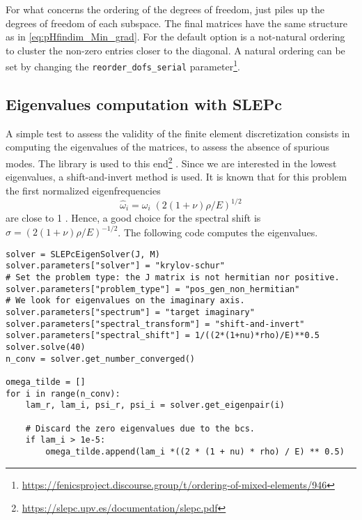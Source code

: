 For what concerns the ordering of the degrees of freedom, \firedrake just piles up the degrees of freedom of each subspace. The final matrices have the same structure as in \eqref{eq:pHfindim_Min_grad}. For \fenics the default option is a not-natural ordering to cluster the non-zero entries closer to the diagonal. A natural ordering can be set by changing the \verb|reorder_dofs_serial| parameter\footnote{\url{https://fenicsproject.discourse.group/t/ordering-of-mixed-elements/946}}.

\subsection*{Eigenvalues computation with SLEPc}
A simple test to assess the validity of the finite element discretization consists in computing the eigenvalues of the matrices, to assess the absence of spurious modes. The {} library is used to this end\footnote{\url{https://slepc.upv.es/documentation/slepc.pdf}} \cite{hernandez2005slepc}. Since we are interested in the lowest eigenvalues, a shift-and-invert method is used. It is known that for this problem the first normalized eigenfrequencies
\[
\widehat{\omega}_i = \omega_i \; (2(1+\nu)\rho/E)^{1/2}
\]
are close to 1 \cite{dawe1980rayleigh}. Hence, a good choice for the spectral shift is $\sigma = (2(1+\nu)\rho/E)^{-1/2}$.  The following code computes the eigenvalues.
\begin{tcolorbox}[title = Eigenvalues computation in  \fenics, coltitle=black, breakable, size=fbox, boxrule=1pt, pad at break*=1mm, colframe=red, enlarge top by=0.25em, enlarge bottom by=0.5em]
\begin{Verbatim}[tabsize=4]
solver = SLEPcEigenSolver(J, M)
solver.parameters["solver"] = "krylov-schur"
# Set the problem type: the J matrix is not hermitian nor positive.
solver.parameters["problem_type"] = "pos_gen_non_hermitian"
# We look for eigenvalues on the imaginary axis.
solver.parameters["spectrum"] = "target imaginary"
solver.parameters["spectral_transform"] = "shift-and-invert"
solver.parameters["spectral_shift"] = 1/((2*(1+nu)*rho)/E)**0.5
solver.solve(40)
n_conv = solver.get_number_converged()

omega_tilde = []
for i in range(n_conv):
	lam_r, lam_i, psi_r, psi_i = solver.get_eigenpair(i)
	
	# Discard the zero eigenvalues due to the bcs.
	if lam_i > 1e-5:
		omega_tilde.append(lam_i *((2 * (1 + nu) * rho) / E) ** 0.5)
\end{Verbatim}
\end{tcolorbox}
